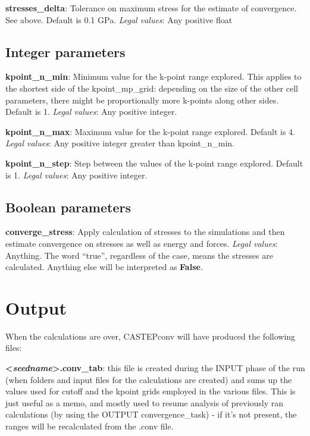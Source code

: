 \documentclass[10pt]{article}
\begin{document}
\textbf{stresses\_delta}: Tolerance on maximum stress for the estimate of convergence. See above. Default is 0.1 GPa.\newline
\textit{Legal values}: Any positive float\newline

\subsection{Integer parameters}

\textbf{kpoint\_n\_min}: Minimum value for the k-point range explored. This applies to the shortest side of the kpoint\_mp\_grid: depending on the size of the other cell parameters, there might be proportionally more k-points along other sides. Default is 1.\newline
\textit{Legal values}: Any positive integer.\newline

\textbf{kpoint\_n\_max}: Maximum value for the k-point range explored. Default is 4.\newline
\textit{Legal values}: Any positive integer greater than kpoint\_n\_min.\newline

\textbf{kpoint\_n\_step}: Step between the values of the k-point range explored. Default is 1.\newline
\textit{Legal values}: Any positive integer.\newline

\subsection{Boolean parameters}

\textbf{converge\_stress}: Apply calculation of stresses to the simulations and then estimate convergence on stresses as well as energy and forces.\newline
\textit{Legal values}: Anything. The word ``true'', regardless of the case, means the stresses are calculated. Anything else will be interpreted as \textbf{False}.\newline

\section{Output}

When the calculations are over, CASTEPconv will have produced the following files:

\textbf{\textless \textit{seedname}\textgreater.conv\_tab}: this file is created during the INPUT phase of the run (when folders and input files for the calculations are created) and sums up the values used for cutoff and the kpoint grids employed in the various files. This is just useful as a memo, and mostly used to resume analysis of previously ran calculations (by using the OUTPUT convergence\_task) - if it's not present, the ranges will be recalculated from the .conv file.
\end{document}
